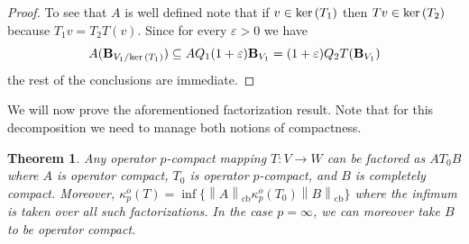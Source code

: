 \documentclass[11pt]{amsart}
\DeclareMathOperator{\cb}{cb}
\newcommand{\n}[1]{ \left\|#1\right\| }
\newtheorem{theorem}{Theorem}[section]
\numberwithin{equation}{section}
\def\ker{{\rm ker\, }}
\begin{document}
\begin{proof}
 To see that  $A$ is well defined note that if $v\in\ker(T_1) $ then $Tv\in\ker(T_2)$ because $T_1v=T_2T(v)$.
Since for every $\varepsilon>0$ we have
\[
A(\mathbf{B}_{V_1/\ker(T_1)}) \subseteq AQ_1(1+\varepsilon)\mathbf{B}_{V_1} = (1+\varepsilon) Q_2T(\mathbf{B}_{V_1})
\]
the rest of the conclusions are immediate.
\end{proof}

We will now prove the aforementioned factorization result. Note that for this decomposition we need to manage both notions of compactness. 


\begin{theorem}\label{thm-factorization-Choi-Kim}
Any operator $p$-compact mapping $T: V \to W$ can be factored as $AT_0B$ where $A$ is operator compact, $T_0$ is operator $p$-compact, and $B$ is completely compact. Moreover, $\kappa_p^o(T) = \inf\{ \n{A}_{\cb} \kappa_p^o(T_0) \n{B}_{\cb} \}$ where the infimum is taken over all such factorizations.
In the case $p=\infty$, we can moreover take $B$ to be operator compact. 
\end{theorem}
\end{document}
